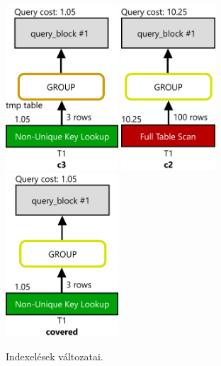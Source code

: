\begin{figure}[h!]
\centering
\includegraphics[width=4.2cm]{images/explain/2-4.png}
\hspace{1cm} 
\includegraphics[width=3.51cm]{images/explain/2-2.png}
\hspace{1cm} 
\includegraphics[width=4.2cm]{images/explain/covered.png}
\caption{Indexelések változatai.}
\label{fig:covered}
\end{figure}

